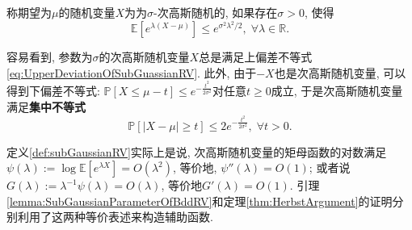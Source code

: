 \begin{definition}[次高斯随机变量]\label{def:subGaussianRV}
	称期望为$\mu$的随机变量$X$为为$\sigma$-次高斯随机的, 如果存在$\sigma > 0$, 使得
	\begin{equation*}
		\mathbb{E}[e^{\lambda(X - \mu)}] \leq e^{\sigma^2 \lambda^2 /2},\; \forall \lambda \in \mathbb{R}.   
	\end{equation*}  
\end{definition}
容易看到, 参数为$\sigma$的次高斯随机变量$X$总是满足上偏差不等式 \eqref{eq:UpperDeviationOfSubGuassianRV}.  
此外, 由于$-X$也是次高斯随机变量, 可以得到下偏差不等式: $\mathbb{P}[X \leq \mu - t] \leq e^{- \frac{t^2}{2 \sigma^2}}$对任意$t \geq 0$成立, 于是次高斯随机变量满足\textbf{集中不等式}
\begin{equation}\label{eq:SubGuassianConcentration}
	\mathbb{P}[|X - \mu| \geq t] \leq 2 e^{- \frac{t^2}{2 \sigma^2}},\; \forall t > 0. 
\end{equation}

\begin{remark}[辅助函数的构造]
	定义\ref{def:subGaussianRV}实际上是说, 次高斯随机变量的矩母函数的对数满足$\psi(\lambda) := \log \mathbb{E}[e^{\lambda X}] = O(\lambda^2)$, 等价地, $\psi''(\lambda) = O(1)$; 
	或者说$G(\lambda) := \lambda^{-1} \psi(\lambda) = O(\lambda)$, 等价地$G'(\lambda) = O(1)$. 
	引理\ref{lemma:SubGaussianParameterOfBddRV}和定理\ref{thm:HerbstArgument}的证明分别利用了这两种等价表述来构造辅助函数. 
\end{remark}

